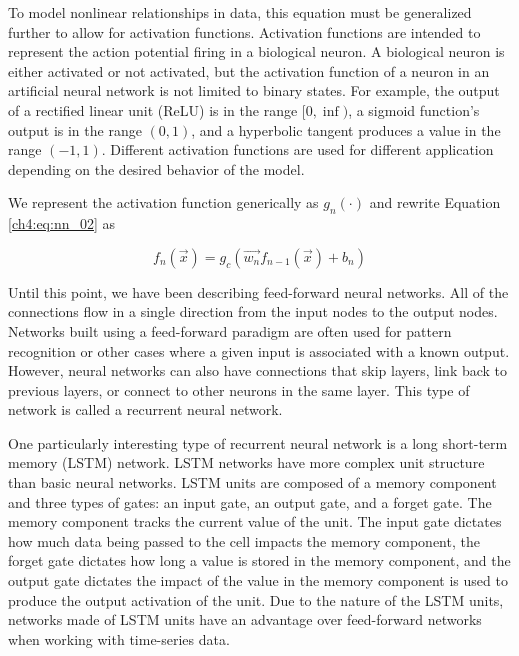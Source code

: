 To model nonlinear relationships in data, this equation must be generalized further to allow for activation functions. Activation functions are intended to represent the action potential firing in a biological neuron. A biological neuron is either activated or not activated, but the activation function of a neuron in an artificial neural network is not limited to binary states. For example, the output of a rectified linear unit (ReLU) is in the range $[0, \inf)$, a sigmoid function's output is in the range $(0, 1)$, and a hyperbolic tangent produces a value in the range $(-1, 1)$. Different activation functions are used for different application depending on the desired behavior of the model.

We represent the activation function generically as $g_n(\cdot)$ and rewrite Equation \ref{ch4:eq:nn_02} as

\begin{equation}
\label{ch4:eq:nn_03}
f_n(\vec{x}) = g_c \left( \vec{w_n} f_{n-1}(\vec{x})+ b_n \right)
\end{equation}

Until this point, we have been describing feed-forward neural networks. All of the connections flow in a single direction from the input nodes to the output nodes. Networks built using a feed-forward paradigm are often used for pattern recognition or other cases where a given input is associated with a known output. However, neural networks can also have connections that skip layers, link back to previous layers, or connect to other neurons in the same layer. This type of network is called a recurrent neural network.

One particularly interesting type of recurrent neural network is a long short-term memory (LSTM) network. LSTM networks have more complex unit structure than basic neural networks. LSTM units are composed of a memory component and three types of gates: an input gate, an output gate, and a forget gate. The memory component tracks the current value of the unit. The input gate dictates how much data being passed to the cell impacts the memory component, the forget gate dictates how long a value is stored in the memory component, and the output gate dictates the impact of the value in the memory component is used to produce the output activation of the unit. Due to the nature of the LSTM units, networks made of LSTM units have an advantage over feed-forward networks when working with time-series data. 



